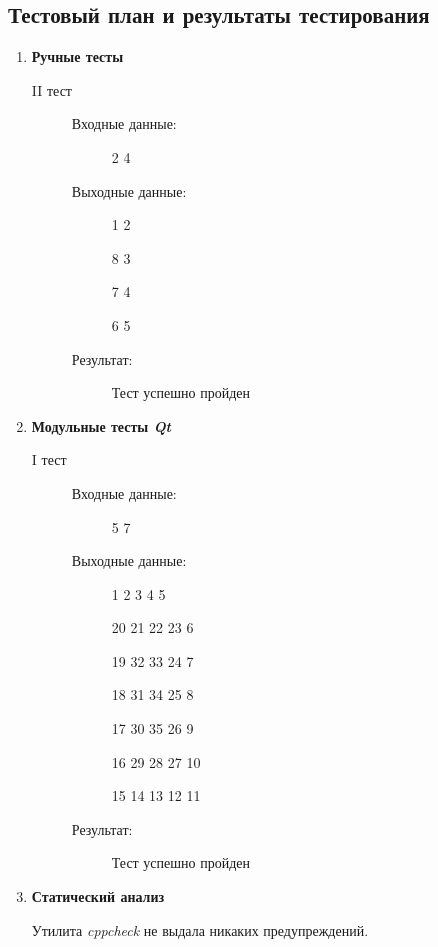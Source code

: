 \documentclass[12pt,a4paper]{report}
\begin{document}
\subsection{Тестовый план и результаты тестирования}
\begin{enumerate}
\item \textbf{Ручные тесты}
\begin{description}
\item[II тест]
\hspace{\parindent}
\begin{flushleft}
\begin{description}
\item[Входные данные:] 2 4
\item[Выходные данные:]
\hspace{\parindent}
\begin{flushleft}
 1  2 
 
 8  3
 
 7  4
 
 6  5
\end{flushleft}
\item[Результат:] Тест успешно пройден
\end{description}
\end{flushleft}
\end{description}

\item \textbf{Модульные тесты \textit{Qt}}

\begin{description}
\item[I тест]
\hspace{\parindent}
\begin{flushleft}
\begin{description}
\item[Входные данные:] 5 7
\item[Выходные данные:]
\hspace{\parindent}
\begin{flushleft}
 1  2  3  4  5 

20 21 22 23  6

19 32 33 24  7

18 31 34 25  8

17 30 35 26  9

16 29 28 27 10

15 14 13 12 11
\end{flushleft}
\item[Результат:] Тест успешно пройден
\end{description}
\end{flushleft}
\end{description}


\item \textbf{Статический анализ}

\hspace{\parindent} Утилита \textit{cppcheck} не выдала никаких предупреждений.

\end{enumerate}
\end{document}
